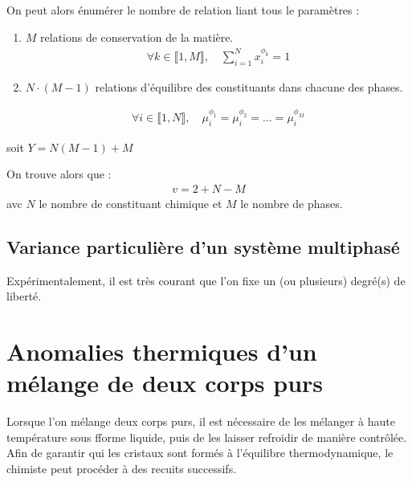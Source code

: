 \documentclass[a4paper]{book}
\begin{document}
On peut alors énumérer le nombre de relation liant tous le paramètres : 
\begin{enumerate}
\item $M$ relations de conservation de la matière.
\begin{align*}
\forall k \in \llbracket 1, M \rrbracket, \quad \sum_{i = 1}^N x_i^{\phi_k} = 1
\end{align*}

\item $N \cdot (M-1)$ relations d'équilibre des constituants dans chacune des phases.

\begin{align*}
\forall i \in \llbracket 1, N \rrbracket, \quad \mu_i^{\phi_1} = \mu_i^{\phi_2} = \ldots =  \mu_i^{\phi_M}
\end{align*}

\end{enumerate}

soit $Y = N (M-1) + M$

On trouve alors que : 
\begin{align*}
v = 2 + N - M
\end{align*}
avc $N$ le nombre de constituant chimique et $M$ le nombre de phases.


\subsection{Variance particulière d'un système multiphasé}
Expérimentalement, il est très courant que l'on fixe un (ou plusieurs) degré(s) de liberté.	


\section{Anomalies thermiques d'un mélange de deux corps purs}

Lorsque l'on mélange deux corps purs, il est nécessaire de les mélanger à haute température sous fforme liquide, puis de les laisser refroidir de manière contrôlée. Afin de garantir qui les cristaux sont formés à l'équilibre thermodynamique, le chimiste peut procéder à des recuits successifs.
\end{document}
